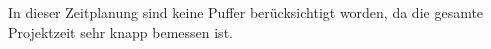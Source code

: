 In dieser Zeitplanung sind keine Puffer berücksichtigt worden, da die gesamte Projektzeit sehr knapp bemessen ist.